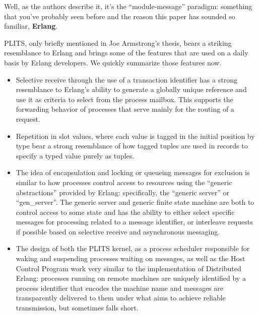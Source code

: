 Well, as the authors describe it, it's the ``module-message'' paradigm: something that you've probably seen before and the reason this paper has sounded so familiar, \textbf{Erlang}.  

PLITS, only briefly mentioned in Joe Armstrong's thesis, bears a striking resemblance to Erlang and brings some of the features that are used on a daily basis by Erlang developers.  We quickly summarize those features now.

\begin{itemize}
\item Selective receive through the use of a transaction identifier has a strong resemblance to Erlang's ability to generate a globally unique reference and use it as criteria to select from the process mailbox.  This supports the forwarding behavior of processes that serve mainly for the routing of a request.
\item Repetition in slot values, where each value is tagged in the initial position by type bear a strong resemblance of how tagged tuples are used in records to specify a typed value purely as tuples.  
\item The idea of encapsulation and locking or queueing messages for exclusion is similar to how processes control access to resources using the ``generic abstractions'' provided by Erlang: specifically, the ``generic server'' or ``gen\_server''.  The generic server and generic finite state machine are both to control access to some state and has the ability to either select specific messages for processing related to a message identifier, or interleave requests if possible based on selective receive and asynchronous messaging.
\item The design of both the PLITS kernel, as a process scheduler responsible for waking and suspending processes waiting on messages, as well as the Host Control Program work very similar to the implementation of Distributed Erlang: processes running on remote machines are uniquely identified by a process identifier that encodes the machine name and messages are transparently delivered to them under what aims to achieve reliable transmission, but sometimes falls short.
\end{itemize}
